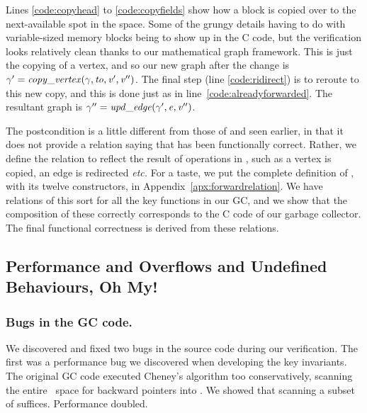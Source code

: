 Lines \ref{code:copyhead} to \ref{code:copyfields} show
how a block is copied over to the next-available spot in the
 space. Some of the grungy details having to do with
variable-sized memory blocks being to show up in the C code,
but the verification looks relatively clean
thanks to our mathematical graph framework.
This is just the copying of a vertex, and so our new graph after the change is
$\gamma' = \mathit{copy\_vertex}(\gamma, \mathit{to}, \mathit{v'}, \mathit{v''})$.
The final step (line \ref{code:ridirect}) is to reroute to this
new copy, and this is done just as in line~\ref{code:alreadyforwarded}. The
resultant graph is $\gamma'' = \mathit{upd\_edge}(\gamma', \mathit{e}, \mathit{v''})$.

The postcondition is a little different from those of 
and  seen earlier, in that it does not provide a relation
saying that  has been functionally correct. Rather, we
define the relation to reflect the result of operations
in , such as a vertex is copied, an edge is redirected
\emph{etc.} For a taste, we put the complete definition
of , with its twelve constructors, 
in Appendix~\ref{apx:forwardrelation}. We
have relations of this sort for all the key functions in our GC, and
we show that the composition of these correctly corresponds to the C
code of our garbage collector. The final functional correctness is
derived from these relations.


%

\subsection{Performance and Overflows and Undefined Behaviours, Oh My!} \label{sec:gcissues}

\subsubsection*{Bugs in the GC code.}
We discovered and fixed two bugs in the source code during our verification.
The first was a performance bug we discovered when developing the key invariants.
The original GC code executed Cheney's algorithm too conservatively,
scanning the entire~ space for backward pointers into . We
showed that scanning a subset of  suffices.  Performance doubled.

